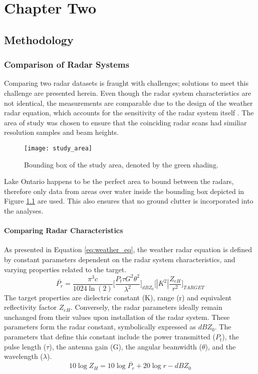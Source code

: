 \chapter{Chapter Two}
\section{Methodology}
\subsection{Comparison of Radar Systems}
Comparing two radar datasets is fraught with challenges; solutions to meet this challenge are presented herein. Even though the radar system characteristics
are not identical, the measurements are comparable due to the design of the weather radar equation, which accounts for the sensitivity of the radar system
itself \citep{Rogers1989}. The area of study was chosen to ensure that the coinciding radar scans had similiar resolution samples and beam heights. 
\begin{figure}[h]
\texttt{[image: study\_area]}\centering
\caption{Bounding box of the study area, denoted by the green shading.} 
\label{fig:study_area}
\end{figure}
Lake Ontario happens to be the perfect area to bound between the radars, therefore only data from areas over water inside the bounding box depicted in Figure
\ref{fig:study_area} are used. This also ensures that no ground clutter is incorporated into the analyses.
\subsubsection{Comparing Radar Characteristics}

As presented in Equation \ref{eq:weather_eq}, the weather radar equation is defined by constant parameters dependent on the radar system characteristics, and
varying properties related to the target. 
\begin{equation}\label{eq:weather_eq}
\bar{P_r} = \frac{\pi^3c}{1024 \ln(2)} \Bigg[\frac{P_t \tau G^2 \theta^2}{\lambda^2}\Bigg]_{dBZ_0} \Bigg[|K^2|\frac{Z_{eH}}{r^2}\Bigg]_{TARGET}
\end{equation}
The target properties are dielectric constant (K), range (r) and equivalent reflectivity factor $Z_{eH}$. Conversely, the radar parameters ideally remain
unchanged from their values upon installation of the radar system. These parameters form the radar constant, symbolically expressed as $dBZ_0$. The
parameters that define this constant include the power transmitted ($P_t$), the pulse length ($\tau$), the antenna gain (G), the angular beamwidth
($\theta$), and the wavelength ($\lambda$).
\begin{equation}\label{eq:radpow}
10 \log Z_{H} = 10 \log{\bar{P_r}} + 20 \log r - dBZ_0
\end{equation}

